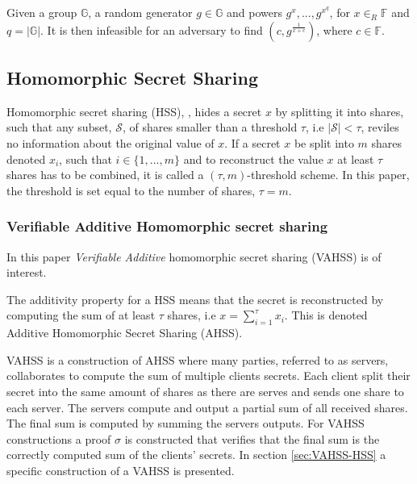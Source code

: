 \vspace{10pt}
\begin{Ass}
\label{ass:DHA}
 Given a group $\mathds{G}$, a random generator $g\in \mathds{G}$ and powers $g^x,...,g^{x^q}$, for $x \in_R \mathds{F}$ and  $q= |\mathds{G}|$. It is then  infeasible for an adversary to find $(c, g^{\frac{1}{x+c}})$, where $c \in \mathds{F}$.
\end{Ass}




\subsection*{Homomorphic Secret Sharing}
Homomorphic secret sharing (HSS), \cite{How_share_A_secret}, hides a secret $x$ by splitting it into shares, such that any subset, $\mathcal{S}$, of shares smaller than a threshold $\tau$, i.e $|\mathcal{S}|<\tau$, reviles no information about the original value of $x$.  
If  a secret $x$ be split into $m$ shares denoted $x_i$, such that $ i\in\{1,...,m\}$ and to reconstruct the value $x$ at least $\tau$ shares has to be combined, it is called a $(\tau,m)$-threshold scheme. In this paper, the threshold is set equal to the number of shares,  $\tau=m$. 

\subsubsection*{Verifiable Additive Homomorphic secret sharing}
In this paper \textit{Verifiable Additive}  homomorphic secret sharing  (VAHSS) is of interest.  

The additivity property for a HSS means that the secret is reconstructed by computing the sum of at least $\tau$ shares, i.e $x = \sum_{i=1}^\tau x_i$. This is denoted Additive Homomorphic Secret Sharing (AHSS).

VAHSS is a construction of AHSS where many parties, referred to as servers, collaborates to compute the sum of multiple clients secrets. Each client split their secret into the same amount of shares as there are serves and sends one share to each server. The servers compute and output a partial sum of all received shares. The final sum is computed by summing the servers outputs. For VAHSS constructions a proof $\sigma$ is constructed that verifies that the final sum is the correctly computed sum of the clients' secrets. In section \ref{sec:VAHSS-HSS} a specific construction of a VAHSS is presented.


